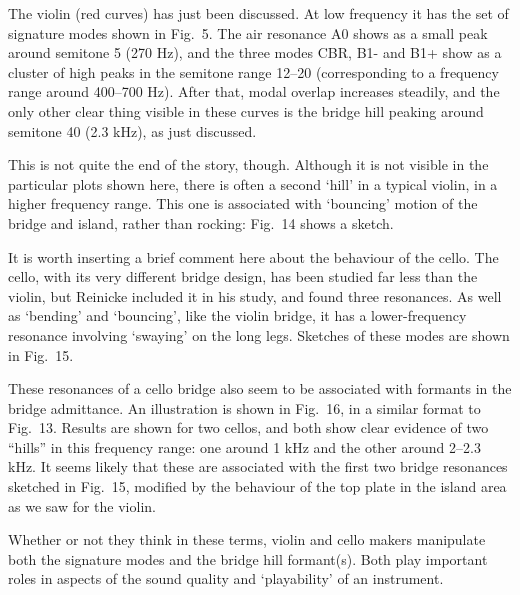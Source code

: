 
  The violin (red curves) has just been discussed. At low frequency it has the 
  set of signature modes shown in Fig.\ 5. The air resonance A0 shows as a 
  small peak around semitone 5 (270 Hz), and the three modes CBR, B1- and B1+ 
  show as a cluster of high peaks in the semitone range 12--20 (corresponding 
  to a frequency range around 400--700 Hz). After that, modal overlap increases 
  steadily, and the only other clear thing visible in these curves is the 
  bridge hill peaking around semitone 40 (2.3 kHz), as just discussed. 

  This is not quite the end of the story, though. Although it is not visible in 
  the particular plots shown here, there is often a second `hill' in a typical 
  violin, in a higher frequency range. This one is associated with `bouncing' 
  motion of the bridge and island, rather than rocking: Fig.\ 14 shows a 
  sketch. 


  It is worth inserting a brief comment here about the behaviour of the cello. 
  The cello, with its very different bridge design, has been studied far less 
  than the violin, but Reinicke included it in his study, and found three 
  resonances. As well as `bending' and `bouncing', like the violin bridge, it 
  has a lower-frequency resonance involving `swaying' on the long legs. 
  Sketches of these modes are shown in Fig.\ 15. 

  These resonances of a cello bridge also seem to be associated with formants 
  in the bridge admittance. An illustration is shown in Fig.\ 16, in a similar 
  format to Fig.\ 13. Results are shown for two cellos, and both show clear 
  evidence of two ``hills'' in this frequency range: one around 1 kHz and the 
  other around 2--2.3 kHz. It seems likely that these are associated with the 
  first two bridge resonances sketched in Fig.\ 15, modified by the behaviour 
  of the top plate in the island area as we saw for the violin. 


  Whether or not they think in these terms, violin and cello makers manipulate 
  both the signature modes and the bridge hill formant(s). Both play important 
  roles in aspects of the sound quality and `playability' of an instrument. 

